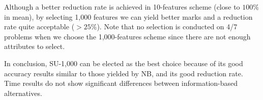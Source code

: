 \documentclass[preprint,12pt]{elsarticle}
\begin{document}
Although a better reduction rate is achieved in 10-features scheme (close to $100\%$ in mean), by selecting 1,000 features we can yield better marks and a reduction rate quite acceptable ($> 25\%$). Note that no selection is conducted on 4/7 problems when we choose the 1,000-features scheme since there are not enough attributes to select.

In conclusion, SU-1,000 can be elected as the best choice because of its good accuracy  results similar to those yielded by NB, and its good reduction rate. Time results do not show significant differences between information-based alternatives.


\end{document}
